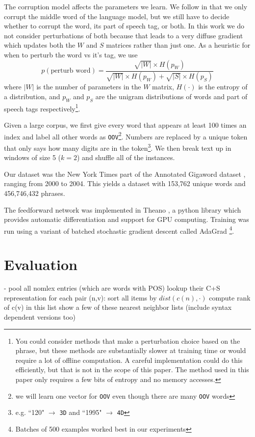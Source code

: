 \documentclass[11pt,letterpaper]{article}
\begin{document}
The corruption model affects the parameters we learn.
We follow \cite{rami} in that we only corrupt the middle word of the language model,
but we still have to decide whether to corrupt the word, its part of speech tag, or both.
In this work we do not consider perturbations of both because that leads to a very
diffuse gradient which updates both the $W$ and $S$ matrices rather than just one.
As a heuristic for when to perturb the word vs it's tag, we use
\[
	p(\mbox{perturb word}) = \frac
		{\sqrt{|W|} \times H(p_W)}
	{\sqrt{|W|} \times H(p_W) + \sqrt{|S|} \times H(p_S)}
\]
where $|W|$ is the number of parameters in the $W$ matrix, $H(\cdot)$ is
the entropy of a distribution, and $p_W$ and $p_S$ are the unigram distributions
of words and part of speech tags respectively\footnote{You could consider methods
that make a perturbation choice based on the phrase, but these methods are
substantially slower at training time or would require a lot of offline computation.
A careful implementation could do this efficiently, but that is not in the scope of this paper.
The method used in this paper only requires a few bits of entropy and no memory accesses.}.



Given a large corpus, we first give every word that appears at least 100
times an index and label all other words as \texttt{OOV}\footnote{we will learn
one vector for \texttt{OOV} even though there are many \texttt{OOV} words}.
Numbers are replaced by a unique token that only says how many digits are in
the token\footnote{e.g. ``120" $\rightarrow$ \texttt{3D} and ``1995" $\rightarrow$ \texttt{4D}}.
We then break text up in windows of size 5 ($k=2$) and shuffle all of the instances.

Our dataset was the New York Times part of the Annotated Gigaword dataset \cite{agiga},
ranging from 2000 to 2004. This yields a dataset with 153,762 unique words and 
456,746,432 phrases.

The feedforward network was implemented in Theano \cite{theano},
a python library which provides automatic differentiation and support for GPU computing.
Training was run using a variant of batched stochastic gradient descent called AdaGrad \cite{adagrad}
\footnote{Batches of 500 examples worked best in our experiments}.









\section{Evaluation} %
- pool all nomlex entries (which are words with POS)
	lookup their C+S representation
	for each pair (n,v):
		sort all items by $dist(c(n), \cdot)$
		compute rank of c(v) in this list
	show a few of these nearest neighbor lists (include syntax dependent versions too)
\end{document}
